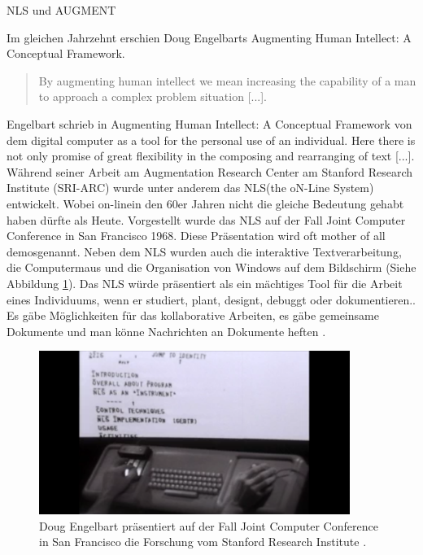 \begin{section}{NLS und AUGMENT}
\label{sec:nls}

Im gleichen Jahrzehnt erschien Doug Engelbarts \glqq Augmenting Human Intellect: A Conceptual Framework\grqq{ }. 

\begin{quote}
\glqq By augmenting human intellect we mean increasing the capability of a man to approach a complex problem situation [...].\grqq{ }\cite[S. 1]{Engelbart1962}
\end{quote}

Engelbart schrieb in \glqq Augmenting Human Intellect: A Conceptual Framework\grqq{ } von dem \glqq digital computer as a tool for the personal use of an individual. Here there is not only promise of great flexibility in the composing and rearranging of text [...]\grqq{ }\cite[S. 17]{Engelbart1962}. Während seiner Arbeit am Augmentation Research Center am Stanford Research Institute (SRI-ARC) wurde unter anderem das \glqq NLS\grqq{ }(the oN-Line System) entwickelt. Wobei \glqq on-line\grqq{ }in den 60er Jahren nicht die gleiche Bedeutung gehabt haben dürfte als Heute. Vorgestellt wurde das NLS auf der Fall Joint Computer Conference in San Francisco 1968. Diese Präsentation wird oft \glqq mother of all demos\grqq{ }genannt. Neben dem NLS wurden auch die interaktive Textverarbeitung, die Computermaus und die Organisation von Windows auf dem Bildschirm (Siehe Abbildung \ref{fig:mother}). Das NLS würde präsentiert als \glqq ein mächtiges Tool für die Arbeit eines Individuums, wenn er studiert, plant, designt, debuggt oder dokumentieren.\grqq{ }\cite{MotherOfDemo1968}. Es gäbe Möglichkeiten für das kollaborative Arbeiten, es gäbe gemeinsame Dokumente und man könne Nachrichten an Dokumente heften \cite{MotherOfDemo1968}. 

\begin{figure}[!ht]
	\centering
	\includegraphics[width=0.9\textwidth]{image/mother}
	\caption{Doug Engelbart präsentiert auf der Fall Joint Computer Conference in San Francisco die Forschung vom Stanford Research Institute \cite{MotherOfDemo1968}.}
	\label{fig:mother}
\end{figure}


\end{section}
